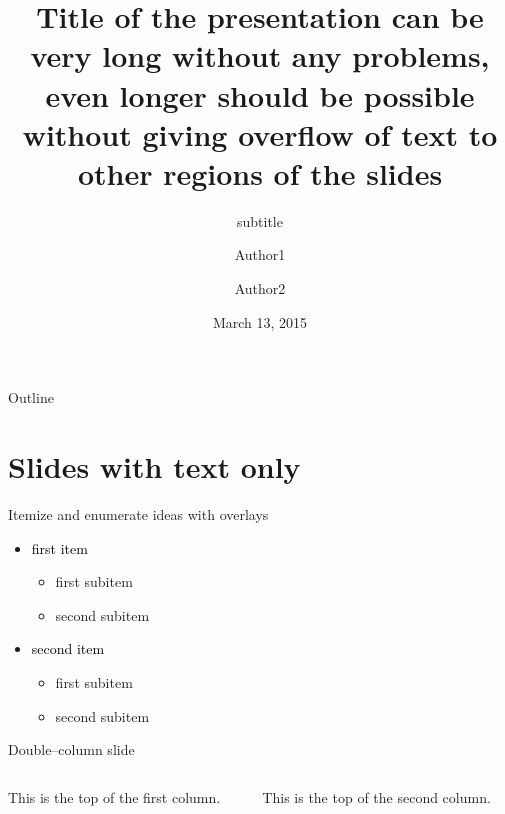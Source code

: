 \documentclass[11pt,t]{beamer}
\title{Title of the presentation can be very long without any problems, even longer should be possible without giving overflow of text to other regions of the slides}
\subtitle{subtitle}
\author{Author1\inst{1} \and Author2\inst{2}}
\institute{
	\inst{1}Institute 1
	\and
	\inst{2}Institute 2
}
\date{March 13, 2015}
\begin{document}
	{
	\begin{frame}
		\titlepage
	\end{frame}
	}
\begin{frame}{Outline}
	\vskip 5mm
	\hfill	{\large \parbox{.95\textwidth}{\tableofcontents[hideallsubsections]}}
\end{frame}

\section{Slides with text only}
\begin{frame}{Itemize and enumerate ideas with overlays}
	\begin{itemize}
		\item \textcolor{black}{first item}
			\begin{itemize}
				\item first subitem
				\item second subitem
			\end{itemize}
		\item \textcolor{black}{second item}
			\begin{itemize}
				\item first subitem
				\item second subitem
			\end{itemize}
	\end{itemize}
\end{frame}
\begin{frame}[t]{Double--column slide}
	\begin{columns}[t]
		\begin{column}{.5\textwidth}
			This is the top of the first column.	
		\end{column}
		\begin{column}{.5\textwidth}
			This is the top of the second column.
		\end{column}
	\end{columns}	
\end{frame}
\end{document}
